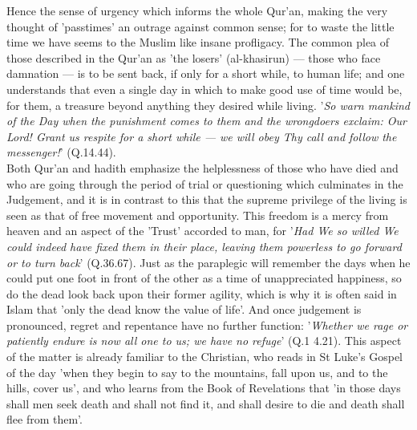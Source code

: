 \documentclass[11pt, b5paper, twoside]{book}
\begin{document}
Hence the sense of urgency which informs the whole Qur'an, making the very thought of 'passtimes' an 
outrage against common sense; for to waste the little time we have seems to the Muslim like insane 
profligacy. The common plea of those described in the Qur'an as 'the losers' (al-khasirun) --- those 
who face damnation --- is to be sent back, if only for a short while, to human life; and one 
understands that even a single day in which to make good use of time would be, for them, a treasure 
beyond anything they desired while living. '\emph{So warn mankind of the Day when the punishment comes to them and the wrongdoers exclaim: Our Lord! Grant us respite for a short while --- we will obey Thy call and follow the messenger!}' (Q.14.44). \\

Both Qur'an and hadith emphasize the helplessness of those who have died and who are going through 
the period of trial or questioning which culminates in the Judgement, and it is in contrast to this 
that the supreme privilege of the living is seen as that of free movement and opportunity. This 
freedom is a mercy from heaven and an aspect of the 'Trust' accorded to man, for '\emph{Had We so willed We could indeed have fixed them in their place, leaving them powerless to go forward or to turn 
back}' (Q.36.67). Just as the paraplegic will remember the days when he could put one foot in front of 
the other as a time of unappreciated happiness, so do the dead look back upon their former agility, 
which is why it is often said in Islam that 'only the dead know the value of life'. And once 
judgement is pronounced, regret and repentance have no further function: '\emph{Whether we rage or 
patiently endure is now all one to us; we have no refuge}' (Q.1 4.21). This aspect of the matter is 
already familiar to the Christian, who reads in St Luke's Gospel of the day 'when they begin to say 
to the mountains, fall upon us, and to the hills, cover us', and who learns from the Book of 
Revelations that 'in those days shall men seek death and shall not find it, and shall desire to die 
and death shall flee from them'. \\
\end{document}
